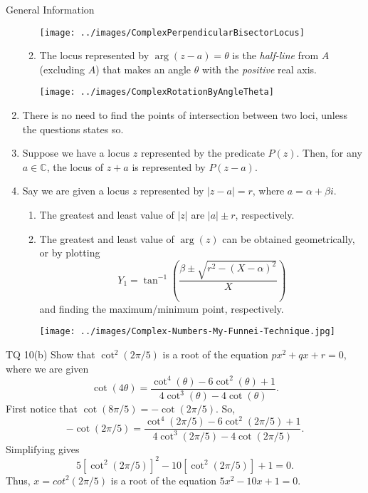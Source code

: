 \documentclass[oneside]{book}
\begin{document}
\begin{stbox}{General Information}
\begin{enumerate}
\begin{enumerate}
\begin{center}
        \texttt{[image: ../images/ComplexPerpendicularBisectorLocus]}
      \end{center}
      \item The locus represented by \(\arg(z-a)=\theta\) is the \emph{half-line} from \(A\) (excluding \(A\)) that makes an angle \(\theta\) with the \emph{positive} real axis.
      \begin{center}
        \texttt{[image: ../images/ComplexRotationByAngleTheta]}
      \end{center}
    \end{enumerate}
    \item There is no need to find the points of intersection between two loci, unless the questions states so. 
    \item Suppose we have a locus \(z\) represented by the predicate \(P(z)\). Then, for any \(a\in \mathbb{C}\), the locus of \(z+a\) is represented by \(P(z-a)\).
    \item Say we are given a locus \(z\) represented by \(\lvert z-a \rvert=r\), where \(a=\alpha+\beta i\). 
    \begin{enumerate}
      \item The greatest and least value of \(\lvert z \rvert\) are \(\lvert a \rvert \pm r\), respectively. 
      \item The greatest and least value of \(\arg(z)\) can be obtained geometrically, or by plotting 
      \[Y_1=\tan^{-1}\left(\frac{\beta\pm\sqrt{r^2-(X-\alpha)^2}}{X}\right)\]
      and finding the maximum/minimum point, respectively.
      \begin{center}
        \texttt{[image: ../images/Complex-Numbers-My-Funnei-Technique.jpg]}
      \end{center}
    \end{enumerate}
  \end{enumerate}
\end{stbox}
\begin{example}{TQ 10(b)}{}
  Show that \(\cot^2(2\pi/5)\) is a root of the equation \(px^2+qx+r=0\), where we are given 
  \[\cot(4\theta)=\frac{\cot^4(\theta)-6\cot^2(\theta)+1}{4\cot^3(\theta)-4\cot(\theta)}.\]
  First notice that \(\cot(8\pi/5)=-\cot(2\pi/5)\). So, 
  \[-\cot(2\pi/5)=\frac{\cot^4(2\pi/5)-6\cot^2(2\pi/5)+1}{4\cot^3(2\pi/5)-4\cot(2\pi/5)}.\]
  Simplifying gives 
  \[5[\cot^2(2\pi/5)]^2-10[\cot^2(2\pi/5)]+1=0.\]
  Thus, \(x=cot^2(2\pi/5)\) is a root of the equation \(5x^2-10x+1=0\). 
\end{example}
\end{document}
